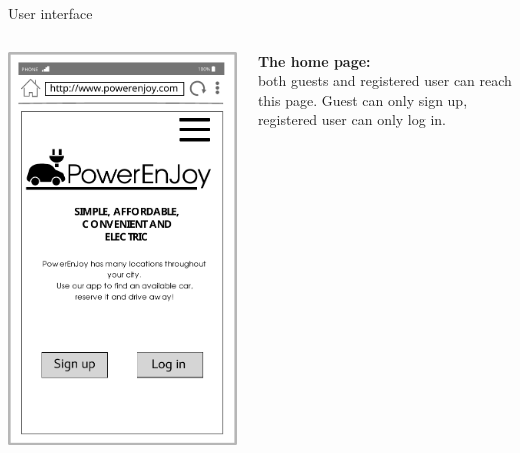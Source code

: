 \documentclass{beamer}
\begin{document}
	\begin{frame}{User interface}
		\begin{columns}
			\begin{column}{0.4\textwidth}
				\includegraphics[width=0.9\columnwidth]{figures/homepage.pdf}
			\end{column}
			\begin{column}{0.4\textwidth}
				\textbf{The home page:} \\ both guests and registered user can reach this page. Guest can only sign up, registered user can only log in.
			\end{column}
		\end{columns}
	\end{frame}
\end{document}
